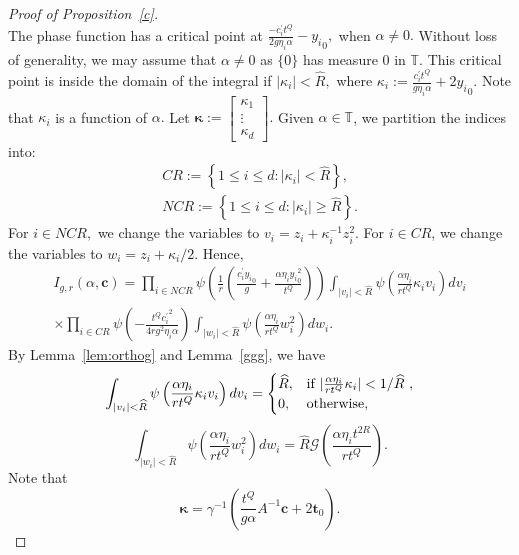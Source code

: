 \documentclass[10pt]{amsart}
\theoremstyle{plain}
\theoremstyle{plain}
\renewcommand{\vec}[1]{\mathbf{#1}}
\theoremstyle{remark}
\theoremstyle{definition}
\newcommand{\hR}{\widehat{R}}
\newcommand{\TT}{\mathbb{T}}
\newcommand{\cG}{\mathcal{G}}
\begin{document}
\begin{proof}[Proof of Proposition~\ref{c}]
\[ \] 
 The phase function has a critical point at $\frac{-c^{\prime}_i t^Q}{2g\eta_i \alpha}-{y_i}_0,$ when $\alpha\neq 0.$ Without loss of generality, we may assume that $\alpha\neq 0$ as $\{0\}$ has measure $0$ in $\TT$. This critical point is inside the domain of the integral if 
 $|\kappa_i|<\hR,$ where $\kappa_i:=\frac{c^{\prime}_i t^Q}{g\eta_i \alpha}+2{y_i}_0.$  Note that $\kappa_i$ is a function of $\alpha.$  Let $\boldsymbol{\kappa}:= \begin{bmatrix}\kappa_1 \\ \vdots \\ \kappa_d \end{bmatrix}.$
  Given $\alpha\in\TT$, we partition the indices into: 
\begin{equation*}
\begin{split}
CR:=\left\{1\leq i\leq d: |\kappa_i|<\hR  \right\},
\\
NCR:=\left\{1\leq i\leq d: |\kappa_i|\geq \hR \right\}.
\end{split}
\end{equation*}
For $i\in NCR,$ we change the variables to 
\(
v_i=z_i + \kappa_i^{-1} z_i^2
\). For $i\in CR$, we change the variables to  $w_i= z_i+\kappa_i/2.$   Hence,
\begin{equation}\label{oceq1}
\begin{split}
I_{g,r}(\alpha,\vec{c})= \prod_{i\in NCR} \psi \left( \frac{1}{r} \left( \frac{c_i^{\prime}{y_i}_0}{g} +\frac{\alpha  \eta_i {y_i}_0^2}{t^Q}   \right)\right)  \int_{|v_i|<\hR}\psi\left(  \frac{\alpha \eta_i }{rt^{Q}} \kappa_i v_i \right) dv_{i}
\\
\times \prod_{i\in CR}\psi (-\frac{t^Q{c_i^{\prime}}^2}{4rg^2\eta_i \alpha}) \int_{|w_i|<\hR}\psi
\left( \frac{\alpha \eta_i }{rt^{Q}}w_i^2  \right) dw_i.
\end{split}
\end{equation}
By Lemma~\ref{lem:orthog} and  Lemma~\ref{ggg}, we have 
\begin{equation}\label{osceq2}
\int_{|v_i|<\hR}\psi\left(    \frac{\alpha \eta_i }{rt^{Q}} \kappa_i v_i   \right) dv_{i}=\begin{cases}
\hR, &\mbox{if $ |\frac{\alpha \eta_i }{rt^{Q}} \kappa_i | <1/\hR$  },\\
0, &\mbox{otherwise,}
\end{cases}
\end{equation}
\[
 \int_{|w_i|<\hR}\psi
\left( \frac{\alpha \eta_i }{rt^{Q}}w_i^2  \right) dw_i=\hR\cG\left(\frac{\alpha \eta_i t^{2R}}{rt^Q}\right).
\]
Note that 
\[
\boldsymbol{\kappa}= \gamma^{-1} \left( \frac{t^Q}{g\alpha}A^{-1} \vec{c}+2\vec{t}_0  \right).
\]
\end{proof}
\end{document}
